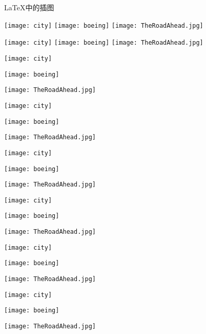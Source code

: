 \documentclass{ctexart}
\begin{document}
	\LaTeX{}中的插图
	
	\texttt{[image: city]}
	\texttt{[image: boeing]}
	\texttt{[image: TheRoadAhead.jpg]} %
	
	\texttt{[image: city]}
	\texttt{[image: boeing]}
	\texttt{[image: TheRoadAhead.jpg]}
	
	\texttt{[image: city]}
	
	\texttt{[image: boeing]}
	
	\texttt{[image: TheRoadAhead.jpg]}
	
	\texttt{[image: city]}
	
	\texttt{[image: boeing]}
	
	\texttt{[image: TheRoadAhead.jpg]}
	
	\texttt{[image: city]}
	
	\texttt{[image: boeing]}
	
	\texttt{[image: TheRoadAhead.jpg]}
	
	\texttt{[image: city]}
	
	\texttt{[image: boeing]}
	
	\texttt{[image: TheRoadAhead.jpg]}
	
	\texttt{[image: city]}
	
	\texttt{[image: boeing]}
	
	\texttt{[image: TheRoadAhead.jpg]}
	
	\texttt{[image: city]}
	
	\texttt{[image: boeing]}
	
	\texttt{[image: TheRoadAhead.jpg]}
	
\end{document}
